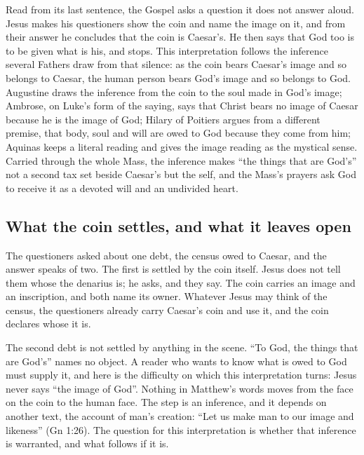 \label{sec:image-and-inscription}

Read from its last sentence, the Gospel asks a question it does not answer
aloud. Jesus makes his questioners show the coin and name the image on it, and
from their answer he concludes that the coin is Caesar's. He then says that
God too is to be given what is his, and stops. This interpretation follows the
inference several Fathers draw from that silence: as the coin bears Caesar's
image and so belongs to Caesar, the human person bears God's image and so
belongs to God. Augustine draws the inference from the coin to the soul made
in God's image; Ambrose, on Luke's form of the saying, says that Christ bears
no image of Caesar because he is the image of God; Hilary of Poitiers argues
from a different premise, that body, soul and will are owed to God because
they come from him; Aquinas keeps a literal reading and gives the image reading
as the mystical sense. Carried through the whole Mass, the inference makes
``the things that are God's'' not a second tax set beside Caesar's but the
self, and the Mass's prayers ask God to receive it as a devoted will and an
undivided heart.

\subsection{What the coin settles, and what it leaves open}

The questioners asked about one debt, the census owed to Caesar, and the
answer speaks of two. The first is settled by the coin itself. Jesus does not
tell them whose the denarius is; he asks, and they say. The coin carries an
image and an inscription, and both name its owner. Whatever Jesus may think of
the census, the questioners already carry Caesar's coin and use it, and the
coin declares whose it is.

The second debt is not settled by anything in the scene. ``To God, the things
that are God's'' names no object. A reader who wants to know what is owed to
God must supply it, and here is the difficulty on which this interpretation
turns: Jesus never says ``the image of God''. Nothing in Matthew's words moves
from the face on the coin to the human face. The step is an inference, and it
depends on another text, the account of man's creation: ``Let us make man to
our image and likeness'' (Gn 1:26). The question for this interpretation is
whether that inference is warranted, and what follows if it is.

